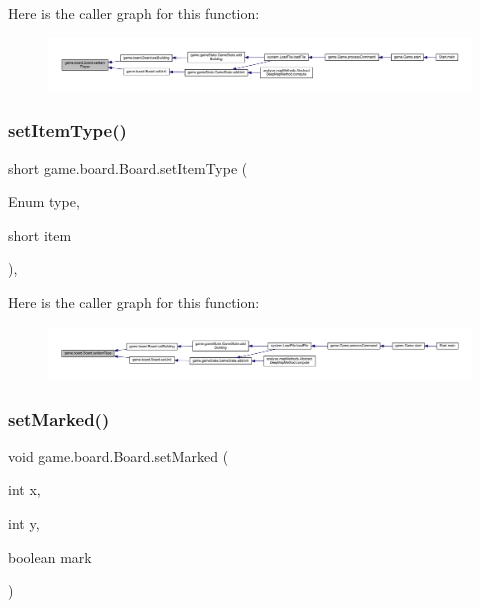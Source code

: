 Here is the caller graph for this function\+:
\nopagebreak
\begin{figure}[H]
\begin{center}
\leavevmode
\includegraphics[width=350pt]{classgame_1_1board_1_1_board_abd6f8157a8e5f4e16a5e831c34a2e6d1_icgraph}
\end{center}
\end{figure}
\mbox{\label{classgame_1_1board_1_1_board_a18c8b769344e85c3890e26c9b3f23e04}} 
\subsubsection{\texorpdfstring{set\+Item\+Type()}{setItemType()}}
{\footnotesize\ttfamily short game.\+board.\+Board.\+set\+Item\+Type (\begin{DoxyParamCaption}\item[{Enum}]{type,  }\item[{short}]{item }\end{DoxyParamCaption})\hspace{0.3cm}{\ttfamily [inline]}, {\ttfamily [private]}}

Here is the caller graph for this function\+:
\nopagebreak
\begin{figure}[H]
\begin{center}
\leavevmode
\includegraphics[width=350pt]{classgame_1_1board_1_1_board_a18c8b769344e85c3890e26c9b3f23e04_icgraph}
\end{center}
\end{figure}
\mbox{\label{classgame_1_1board_1_1_board_a22008b95ac8e2754713eaebac4622ac4}} 
\subsubsection{\texorpdfstring{set\+Marked()}{setMarked()}}
{\footnotesize\ttfamily void game.\+board.\+Board.\+set\+Marked (\begin{DoxyParamCaption}\item[{int}]{x,  }\item[{int}]{y,  }\item[{boolean}]{mark }\end{DoxyParamCaption})\hspace{0.3cm}{\ttfamily [inline]}}



